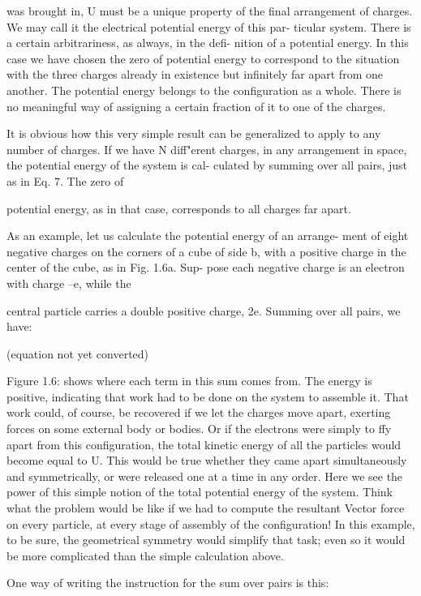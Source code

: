was brought in, U must be a unique property of the final arrangement
of charges. We may call it the electrical potential energy of this par-
ticular system. There is a certain arbitrariness, as always, in the defi-
nition of a potential energy. In this case we have chosen the zero
of potential energy to correspond to the situation with the three
charges already in existence but infinitely far apart from one another.
The potential energy belongs to the configuration as a whole. There
is no meaningful way of assigning a certain fraction of it to one of the
charges.

It is obvious how this very simple result can be generalized to
apply to any number of charges. If we have N diff"erent charges, in
any arrangement in space, the potential energy of the system is cal-
culated by summing over all pairs, just as in Eq. 7. The zero of

potential energy, as in that case, corresponds to all charges far apart.

As an example, let us calculate the potential energy of an arrange-
ment of eight negative charges on the corners of a cube of side b,
with a positive charge in the center of the cube, as in Fig. 1.6a. Sup-
pose each negative charge is an electron with charge --e, while the

central particle carries a double positive charge, 2e. Summing over
all pairs, we have:

(equation not yet converted)

Figure 1.6: shows where each term in this sum comes from. The
energy is positive, indicating that work had to be done on the system
to assemble it. That work could, of course, be recovered if we let the
charges move apart, exerting forces on some external body or bodies.
Or if the electrons were simply to ffy apart from this configuration,
the total kinetic energy of all the particles would become equal to U.
This would be true whether they came apart simultaneously and
symmetrically, or were released one at a time in any order. Here
we see the power of this simple notion of the total potential energy
of the system. Think what the problem would be like if we had to
compute the resultant Vector force on every particle, at every stage
of assembly of the configuration! In this example, to be sure, the
geometrical symmetry would simplify that task; even so it would be
more complicated than the simple calculation above.

One way of writing the instruction for the sum over pairs is this:

